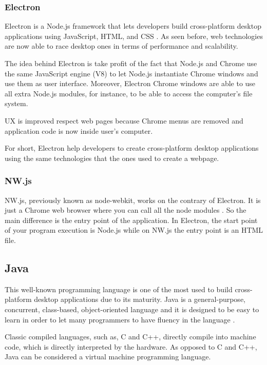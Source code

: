 \subsubsection{Electron}

Electron is a Node.js framework that lets developers build cross-platform
desktop applications using JavaScript, HTML, and CSS \cite{electron-web}. As
seen before, web technologies are now able to race desktop ones in terms of
performance and scalability.

The idea behind Electron is take profit of the fact that Node.js and Chrome use
the same JavaScript engine (V8) to let Node.js instantiate Chrome windows and
use them as user interface. Moreover, Electron Chrome windows are able to use
all extra Node.js modules, for instance, to be able to access the computer's
file system.

UX is improved respect web pages because Chrome menus are removed and
application code is now inside user's computer.

For short, Electron help developers to create cross-platform desktop 
applications using the same technologies that the ones used to create a webpage.

\subsubsection{NW.js}

NW.js, previously known as node-webkit, works on the contrary of Electron. It
is just a Chrome web browser where you can call all the node modules
\cite{nwjs-web}. So the main difference is the entry point of the application.
In Electron, the start point of your program execution is Node.js while on
NW.js the entry point is an HTML file.

\subsection{Java}

This well-known programming language is one of the most used to build
cross-platform desktop applications due to its maturity. Java is a
general-purpose, concurrent, class-based, object-oriented language and it is
designed to be easy to learn in order to let many programmers to have fluency
in the language \cite{java-8-specs}.

Classic compiled languages, such as, C and C++, directly compile into machine
code, which is directly interpreted by the hardware. As opposed to C and C++,
Java can be considered a virtual machine programming language.


